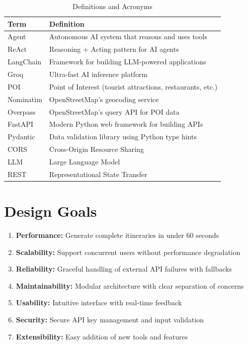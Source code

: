\documentclass[12pt,a4paper]{report}
\begin{document}
\begin{table}[H]
\centering
\begin{tabular}{|l|p{10cm}|}
\hline
\textbf{Term} & \textbf{Definition} \\
\hline
Agent & Autonomous AI system that reasons and uses tools \\
\hline
ReAct & Reasoning + Acting pattern for AI agents \\
\hline
LangChain & Framework for building LLM-powered applications \\
\hline
Groq & Ultra-fast AI inference platform \\
\hline
POI & Point of Interest (tourist attractions, restaurants, etc.) \\
\hline
Nominatim & OpenStreetMap's geocoding service \\
\hline
Overpass & OpenStreetMap's query API for POI data \\
\hline
FastAPI & Modern Python web framework for building APIs \\
\hline
Pydantic & Data validation library using Python type hints \\
\hline
CORS & Cross-Origin Resource Sharing \\
\hline
LLM & Large Language Model \\
\hline
REST & Representational State Transfer \\
\hline
\end{tabular}
\caption{Definitions and Acronyms}
\label{tab:definitions}
\end{table}

\section{Design Goals}

\begin{enumerate}[leftmargin=*]
    \item \textbf{Performance:} Generate complete itineraries in under 60 seconds
    \item \textbf{Scalability:} Support concurrent users without performance degradation
    \item \textbf{Reliability:} Graceful handling of external API failures with fallbacks
    \item \textbf{Maintainability:} Modular architecture with clear separation of concerns
    \item \textbf{Usability:} Intuitive interface with real-time feedback
    \item \textbf{Security:} Secure API key management and input validation
    \item \textbf{Extensibility:} Easy addition of new tools and features
\end{enumerate}
\end{document}
